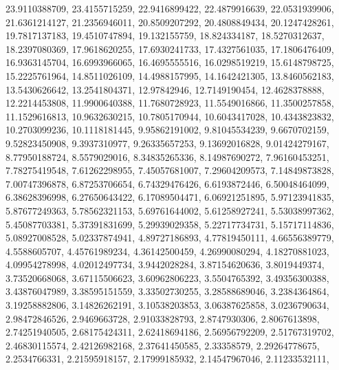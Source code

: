 \begin{code}
\begin{hide}
{     23.9110388709,     23.4155715259,     22.9416899422,
     22.4879916639,     22.0531939906,     21.6361214127,
     21.2356946011,     20.8509207292,     20.4808849434,
     20.1247428261,     19.7817137183,     19.4510747894,
      19.132155759,      18.824334187,     18.5270312637,
     18.2397080369,     17.9618620255,     17.6930241733,
     17.4327561035,     17.1806476409,     16.9363145704,
     16.6993966065,     16.4695555516,     16.0298519219,
     15.6148798725,     15.2225761964,     14.8511026109,
     14.4988157995,     14.1642421305,     13.8460562183,
     13.5430626642,     13.2541804371,       12.97842946,
     12.7149190454,     12.4628378888,     12.2214453808,
     11.9900640388,     11.7680728923,     11.5549016866,
     11.3500257858,     11.1529616813,     10.9632630215,
     10.7805170944,     10.6043417028,     10.4343823832,
     10.2703099236,     10.1118181445,     9.95862191002,
     9.81045534239,      9.6670702159,     9.52823450908,
      9.3937310977,     9.26335657253,     9.13692016828,
     9.01424279167,     8.77950188724,      8.5579029016,
     8.34835265336,     8.14987690272,     7.96160453251,
     7.78275419548,     7.61262298955,     7.45057681007,
     7.29604209573,     7.14849873828,     7.00747396878,
     6.87253706654,     6.74329476426,      6.6193872446,
     6.50048464099,     6.38628396998,     6.27650643422,
     6.17089504471,     6.06921251895,     5.97123941835,
     5.87677249363,     5.78562321153,     5.69761644002,
     5.61258927241,     5.53038997362,     5.45087703381,
     5.37391831699,     5.29939029358,     5.22717734731,
     5.15717114836,     5.08927008528,     5.02337874941,
     4.89727186893,     4.77819450111,     4.66556389779,
      4.5588605707,     4.45761989234,     4.36142500459,
     4.26990080294,     4.18270881023,     4.09954278998,
     4.02012497734,      3.9442028284,     3.87154620636,
      3.8019449374,     3.73520668068,     3.67115506623,
     3.60962806223,      3.5504765392,     3.49356300388,
     3.43876047989,     3.38595151559,     3.33502730255,
     3.28588689046,      3.2384364864,     3.19258882806,
     3.14826262191,     3.10538203853,     3.06387625858,
      3.0236790634,     2.98472846526,      2.9469663728,
     2.91033828793,      2.8747930306,      2.8067613898,
     2.74251940505,     2.68175424311,     2.62418694186,
     2.56956792209,     2.51767319702,     2.46830115574,
     2.42126982168,     2.37641450585,        2.33358579,
     2.29264778675,      2.2534766331,     2.21595918157,
     2.17999185932,     2.14547967046,     2.11233532111,
}
\end{hide}
\end{code}
